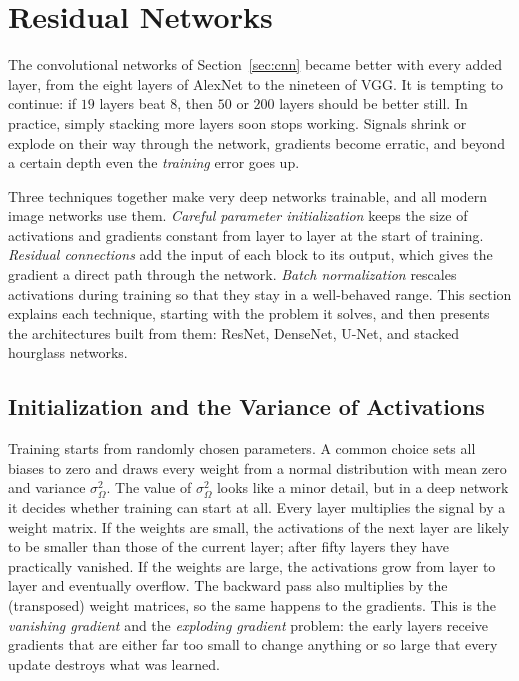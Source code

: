 \section{Residual Networks}
\label{sec:resnet}

The convolutional networks of Section~\ref{sec:cnn} became better with every
added layer, from the eight layers of AlexNet to the nineteen of VGG. It is
tempting to continue: if $19$ layers beat $8$, then $50$ or $200$ layers should
be better still. In practice, simply stacking more layers soon stops working.
Signals shrink or explode on their way through the network, gradients become
erratic, and beyond a certain depth even the \emph{training} error goes up.

Three techniques together make very deep networks trainable, and all modern
image networks use them. \emph{Careful parameter initialization} keeps the size
of activations and gradients constant from layer to layer at the start of
training. \emph{Residual connections} add the input of each block to its output,
which gives the gradient a direct path through the network. \emph{Batch
normalization} rescales activations during training so that they stay in a
well-behaved range. This section explains each technique, starting with the
problem it solves, and then presents the architectures built from them: ResNet,
DenseNet, U-Net, and stacked hourglass networks.

\subsection{Initialization and the Variance of Activations}

Training starts from randomly chosen parameters. A common choice sets all biases
to zero and draws every weight from a normal distribution with mean zero and
variance $\sigma_\Omega^2$. The value of $\sigma_\Omega^2$ looks like a minor
detail, but in a deep network it decides whether training can start at all.
Every layer multiplies the signal by a weight matrix. If the weights are small,
the activations of the next layer are likely to be smaller than those of the
current layer; after fifty layers they have practically vanished. If the weights
are large, the activations grow from layer to layer and eventually overflow.
The backward pass also multiplies by the (transposed) weight matrices, so the
same happens to the gradients. This is the \emph{vanishing gradient} and the
\emph{exploding gradient} problem: the early layers receive gradients that are
either far too small to change anything or so large that every update destroys
what was learned.

